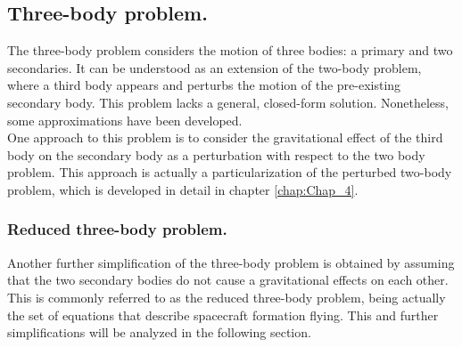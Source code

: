 		\subsection{Three-body problem.}
		\indent The three-body problem considers the motion of three bodies: a primary and two secondaries. It can be understood as an extension of the two-body problem, where a third body appears and perturbs the motion of the pre-existing secondary body. This problem lacks a general, closed-form solution. Nonetheless, some approximations have been developed. \\
		\indent One approach to this problem is to consider the gravitational effect of the third body on the secondary body as a perturbation with respect to the two body problem. This approach is actually a particularization of the perturbed two-body problem, which is developed in detail in chapter \ref{chap:Chap_4}.
			\subsubsection{Reduced three-body problem.}
			\indent Another further simplification of the three-body problem is obtained by assuming that the two secondary bodies do not cause a gravitational effects on each other. This is commonly referred to as the reduced three-body problem, being actually the set of equations that describe spacecraft formation flying. This and further simplifications will be analyzed in the following section.\\
